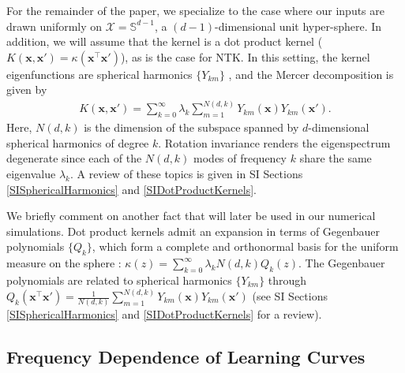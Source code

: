 \documentclass{article}
\begin{document}
For the remainder of the paper, we specialize to the case where our inputs are drawn uniformly on $\mathcal{X} = \mathbb{S}^{d-1}$, a $(d-1)$-dimensional unit hyper-sphere. In addition, we will assume that the kernel is a dot product kernel ($K(\mathbf{x},\mathbf{x}') = \kappa(\mathbf{x}^\top \mathbf{x}')$), as is the case for NTK. 
In this setting, the kernel eigenfunctions are spherical harmonics $\{Y_{km}\}$ \cite{bietti2019inductive,costasspherical}, and the Mercer decomposition is given by
%
\begin{align}\label{dmercer}
    K(\mathbf{x}, \mathbf{x'}) = \sum_{k=0}^\infty \lambda_k \sum_{m=1}^{N(d,k)} Y_{km}(\mathbf{x}) Y_{km}(\mathbf{x'}).
\end{align}
%
Here, $N(d,k)$ is the dimension of the subspace spanned by $d$-dimensional spherical harmonics of degree $k$. Rotation invariance renders the eigenspectrum degenerate since each of the $N(d,k)$ modes of frequency $k$ share the same eigenvalue $\lambda_k$. A review of these topics is given in SI Sections \ref{SISphericalHarmonics} and \ref{SIDotProductKernels}. 

We briefly comment on another fact that will later be used in our numerical simulations. Dot product kernels admit an expansion in terms of Gegenbauer polynomials $\{Q_k\}$, which form a complete and orthonormal basis for the uniform measure on the sphere \cite{Dai_2013}:  $\kappa(z) = \sum_{k=0}^\infty \lambda_k N(d,k) Q_{k}(z)$. The Gegenbauer polynomials are related to spherical harmonics $\{Y_{km}\}$ through $Q_k(\mathbf{x}^\top \mathbf{x}') = \frac{1}{N(d,k)} \sum_{m=1}^{N(d,k)} Y_{km}(\mathbf{x}) Y_{km}(\mathbf{x}')$ \cite{Dai_2013}  (see SI Sections \ref{SISphericalHarmonics} and \ref{SIDotProductKernels} for a review). 

  

\subsection{Frequency Dependence of Learning Curves}
\end{document}
